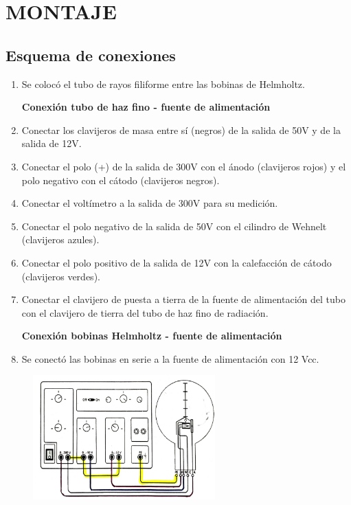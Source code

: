 \documentclass[a4paper]{article}
\begin{document}
\section{MONTAJE}
    \renewcommand{\theenumi}{\roman{enumi}}

    \subsection{Esquema de conexiones}

        \begin{enumerate}
            \item Se colocó el tubo de rayos filiforme entre las bobinas de Helmholtz.

            \textbf{Conexión tubo de haz fino - fuente de alimentación}

            \item Conectar los clavijeros de masa entre sí (negros) de la salida de 50V y de la salida de 12V.
            \item Conectar el polo (+) de la salida de 300V con el ánodo (clavijeros rojos) y el polo negativo con el cátodo (clavijeros negros).
            \item Conectar el voltímetro a la salida de 300V para su medición.
            \item Conectar el polo negativo de la salida de 50V con el cilindro de Wehnelt (clavijeros azules).
            \item Conectar el polo positivo de la salida de 12V con la calefacción de cátodo (clavijeros verdes).
            \item Conectar el clavijero de puesta a tierra de la fuente de alimentación del tubo con el clavijero de tierra del tubo de haz fino de radiación.

\newpage
\noindent
\thispagestyle{fancy}

            \textbf{Conexión bobinas Helmholtz - fuente de alimentación}

            \item Se conectó las bobinas en serie a la fuente de alimentación con 12 Vcc.
        \end{enumerate}

        \begin{figure}[h!]
            \centering
            \includegraphics[width = 7cm] {../imagenes/esquemaConexionTuboDeHazFuenteAlim.png}
        \end{figure}
\end{document}
